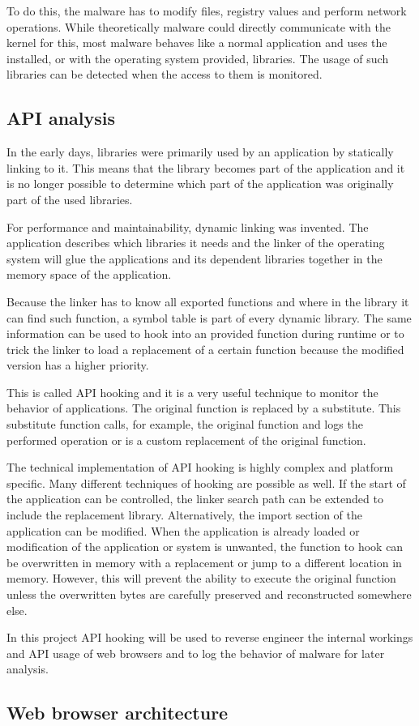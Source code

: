 To do this, the malware has to modify files, registry values  and perform network operations. While theoretically malware could directly communicate with the kernel for this, most malware behaves like a normal application and uses the installed, or with the operating system provided, libraries. The usage of such libraries can be detected when the access to them is monitored.

\subsection{API analysis}

In the early days, libraries were primarily used by an application by statically linking to it. This means that the library becomes part of the application and it is no longer possible to determine which part of the application was originally part of the used libraries.

For performance and maintainability, dynamic linking was invented. The application describes which libraries it needs and the linker of the operating system will glue the applications and its dependent libraries together in the memory space of the application. 

Because the linker has to know all exported functions and where in the library it can find such function, a symbol table is part of every dynamic library. The same information can be used to hook into an provided function during runtime or to trick the linker to load a replacement of a certain function because the modified version has a higher priority.

This is called API hooking\cite{} and it is a very useful technique to monitor the behavior of applications. The original function is replaced by a substitute. This substitute function calls, for example, the original function and logs the performed operation or  is a custom replacement of the original function.

The technical implementation of API hooking is highly complex and platform specific. Many different techniques\cite{http://jbremer.org/x86-api-hooking-demystified/} of hooking are possible as well. If the start of the application can be controlled, the linker search path can be extended to include the replacement library. Alternatively, the import section of the application can be modified. When the application is already loaded or modification of the application or system is unwanted, the function to hook can be overwritten in memory with a replacement or jump to a different location in memory. However, this will prevent the ability to execute the original function unless the overwritten bytes are carefully preserved and reconstructed somewhere else.

In this project API hooking will be used to reverse engineer the internal workings and API usage of web browsers and to log the behavior of malware for later analysis.

\subsection{Web browser architecture}

